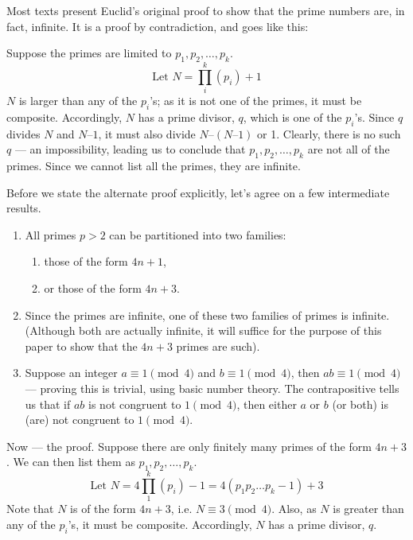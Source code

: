 
Most texts present Euclid’s original proof to show that the prime numbers are, in fact, infinite. It is a proof by contradiction, and goes like this:

Suppose the primes are limited to \(p_1, p_2, \ldots, p_k\).
\[\text{Let } N = \prod_i^k(p_i) + 1\]
\(N\) is larger than any of the \(p_i\)’s; as it is not one of the primes, it must be composite. Accordingly, \(N\) has a prime divisor, \(q\), which is one of the \(p_i\)’s. Since \(q\) divides \(N\) and \(N – 1\), it must also divide \(N – (N – 1)\) or 1. Clearly, there is no such \(q\) --– an impossibility, leading us to conclude that \(p_1, p_2, \ldots, p_k\) are not all of the primes. Since we cannot list all the primes, they are infinite.

Before we state the alternate proof explicitly, let’s agree on a few intermediate results.
\begin{enumerate}
    \item All primes \(p > 2\) can be partitioned into two families:
    \begin{enumerate}
        \item those of the form \(4n + 1\),
        \item or those of the form \(4n + 3\).
    \end{enumerate}
    \item Since the primes are infinite, one of these two families of primes is infinite. (Although both are actually infinite, it will suffice for the purpose of this paper to show that the \(4n + 3\) primes are such).
    \item Suppose an integer \(a \equiv 1 \pmod{4} \) and \(b \equiv 1 \pmod{4} \), then \(ab \equiv 1 \pmod{4} \) --– proving this is trivial, using basic number theory. The contrapositive tells us that if \(ab\) is not congruent to \(1 \pmod{4}\), then either \(a\) or \(b\) (or both) is (are) not congruent to \(1 \pmod{4}\).
\end{enumerate} 

Now --- the proof. Suppose there are only finitely many primes of the form \(4n + 3\). We can then list them as \(p_1, p_2, \ldots, p_k\).
\[\text{Let } N = 4\prod_1^k(p_i) - 1= 4(p_1p_2\ldots{}p_k - 1) + 3\] Note that \(N\) is of the form \(4n + 3\), i.e. \(N \equiv 3 \pmod{4}\). Also, as \(N\) is greater than any of the \(p_i\)’s, it must be composite. Accordingly, \(N\) has a prime divisor, \(q\).

